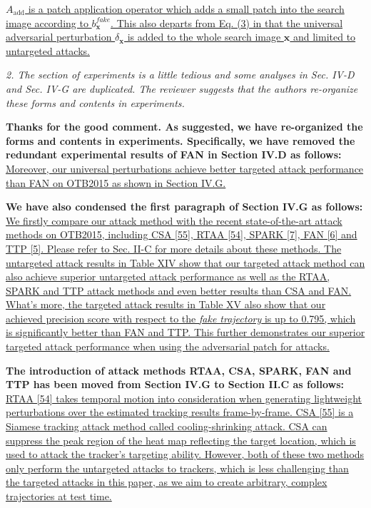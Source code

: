 \documentclass[12pt]{article}
\begin{document}
\uline{$A_{\text{add}}$ is a patch application operator which adds a small patch into the search image according to $b^{fake}_{\textbf{x}}$. This also departs from Eq. (3) in that the universal adversarial perturbation $\delta_\textbf{x}$ is added to the whole search image $\textbf{x}$ and limited to untargeted attacks.}

\textit{2. The section of experiments is a little tedious and some analyses in Sec. IV-D and Sec. IV-G are duplicated. The reviewer suggests that the authors re-organize these forms and contents in experiments.}

\textbf{Thanks for the good comment. As suggested, we have re-organized the forms and contents in experiments. Specifically, we have removed the redundant experimental results of FAN in Section IV.D as follows:} \uline{Moreover, our universal perturbations achieve better targeted attack performance than FAN on OTB2015 as shown in Section IV.G.}

\textbf{We have also condensed the first paragraph of Section IV.G as follows:} \uline{We firstly compare our attack method with the recent state-of-the-art attack methods on OTB2015, including CSA [55], RTAA [54], SPARK [7], FAN [6] and TTP [5]. Please refer to Sec. II-C for more details about these methods. The untargeted attack results in Table XIV show that our targeted attack method can also achieve superior untargeted attack performance as well as the RTAA, SPARK and TTP attack methods and even better results than CSA and FAN. What’s more, the targeted attack results in Table XV also show that our achieved precision score with respect to the \textit{fake trajectory} is up to 0.795, which is significantly better than FAN and TTP. This further demonstrates our superior targeted attack performance when using the adversarial patch for attacks.}

\textbf{The introduction of attack methods RTAA, CSA, SPARK, FAN and TTP has been moved from Section IV.G to Section II.C as follows:} \uline{RTAA [54] takes temporal motion into consideration when generating lightweight perturbations over the estimated tracking results frame-by-frame. CSA [55] is a Siamese tracking attack method called cooling-shrinking attack. CSA can suppress the peak region of the heat map reflecting the target location, which is used to attack the tracker’s targeting ability. However, both of these two methods only perform the untargeted attacks to trackers, which is less challenging than the targeted attacks in this paper, as we aim to create arbitrary, complex trajectories at test time.}
\end{document}
